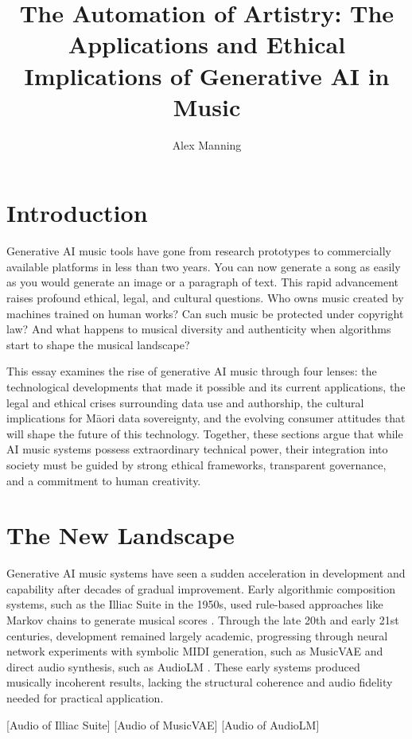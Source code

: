 \documentclass{article}
\title{The Automation of Artistry: The Applications and Ethical Implications of Generative AI in Music}
\author{Alex Manning}
\begin{document}
\maketitle

\section{Introduction}
Generative AI music tools have gone from research prototypes to commercially available platforms in less than two years. You can now generate a song as easily as you would generate an image or a paragraph of text. This rapid advancement raises profound ethical, legal, and cultural questions. Who owns music created by machines trained on human works? Can such music be protected under copyright law? And what happens to musical diversity and authenticity when algorithms start to shape the musical landscape?

This essay examines the rise of generative AI music through four lenses: the technological developments that made it possible and its current applications, the legal and ethical crises surrounding data use and authorship, the cultural implications for Māori data sovereignty, and the evolving consumer attitudes that will shape the future of this technology. Together, these sections argue that while AI music systems possess extraordinary technical power, their integration into society must be guided by strong ethical frameworks, transparent governance, and a commitment to human creativity.

\section{The New Landscape}

Generative AI music systems have seen a sudden acceleration in development and capability after decades of gradual improvement. Early algorithmic composition systems, such as the Illiac Suite in the 1950s, used rule-based approaches like Markov chains to generate musical scores \cite{funk2018musical}. Through the late 20th and early 21st centuries, development remained largely academic, progressing through neural network experiments with symbolic MIDI generation, such as MusicVAE \cite{roberts2018hierarchical} and direct audio synthesis, such as AudioLM \cite{borsos2023audiolm}. These early systems produced musically incoherent results, lacking the structural coherence and audio fidelity needed for practical application.

[Audio of Illiac Suite]
[Audio of MusicVAE]
[Audio of AudioLM]
\end{document}
